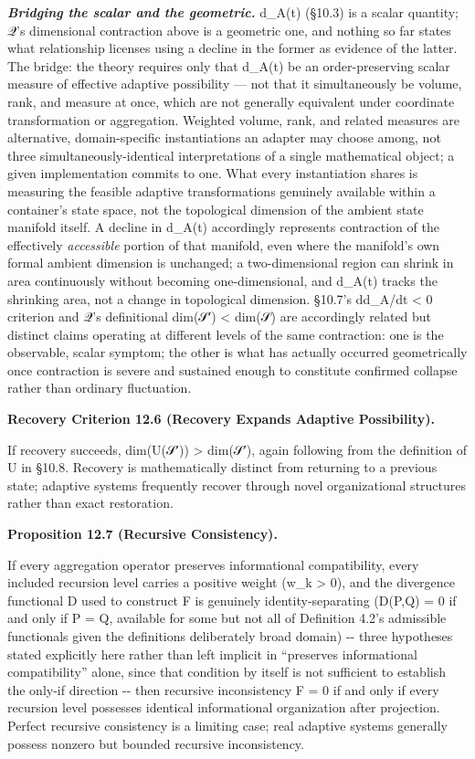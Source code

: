 \documentclass[
]{article}
\begin{document}
\emph{\textbf{Bridging the scalar and the geometric.}} d\_A(t) (§10.3)
is a scalar quantity; 𝒬's dimensional contraction above is a geometric
one, and nothing so far states what relationship licenses using a
decline in the former as evidence of the latter. The bridge: the theory
requires only that d\_A(t) be an order-preserving scalar measure of
effective adaptive possibility --- not that it simultaneously be volume,
rank, and measure at once, which are not generally equivalent under
coordinate transformation or aggregation. Weighted volume, rank, and
related measures are alternative, domain-specific instantiations an
adapter may choose among, not three simultaneously-identical
interpretations of a single mathematical object; a given implementation
commits to one. What every instantiation shares is measuring the
feasible adaptive transformations genuinely available within a
container's state space, not the topological dimension of the ambient
state manifold itself. A decline in d\_A(t) accordingly represents
contraction of the effectively \emph{accessible} portion of that
manifold, even where the manifold's own formal ambient dimension is
unchanged; a two-dimensional region can shrink in area continuously
without becoming one-dimensional, and d\_A(t) tracks the shrinking area,
not a change in topological dimension. §10.7's dd\_A/dt \textless{} 0
criterion and 𝒬's definitional dim(𝒮′) \textless{} dim(𝒮) are
accordingly related but distinct claims operating at different levels of
the same contraction: one is the observable, scalar symptom; the other
is what has actually occurred geometrically once contraction is severe
and sustained enough to constitute confirmed collapse rather than
ordinary fluctuation.

\textbf{Recovery Criterion 12.6 (Recovery Expands Adaptive
Possibility).}

If recovery succeeds, dim(U(𝒮′)) \textgreater{} dim(𝒮′), again following
from the definition of U in §10.8. Recovery is mathematically distinct
from returning to a previous state; adaptive systems frequently recover
through novel organizational structures rather than exact restoration.

\textbf{Proposition 12.7 (Recursive Consistency).}

If every aggregation operator preserves informational compatibility,
every included recursion level carries a positive weight (w\_k
\textgreater{} 0), and the divergence functional D used to construct F
is genuinely identity-separating (D(P,Q) = 0 if and only if P = Q,
available for some but not all of Definition 4.2's admissible functionals
given the definitions deliberately broad domain) -\/- three hypotheses
stated explicitly here rather than left implicit in ``preserves
informational compatibility'' alone, since that condition by itself is
not sufficient to establish the only-if direction -\/- then recursive
inconsistency F = 0 if and only if every recursion level possesses
identical informational organization after projection. Perfect recursive
consistency is a limiting case; real adaptive systems generally possess
nonzero but bounded recursive inconsistency.
\end{document}
